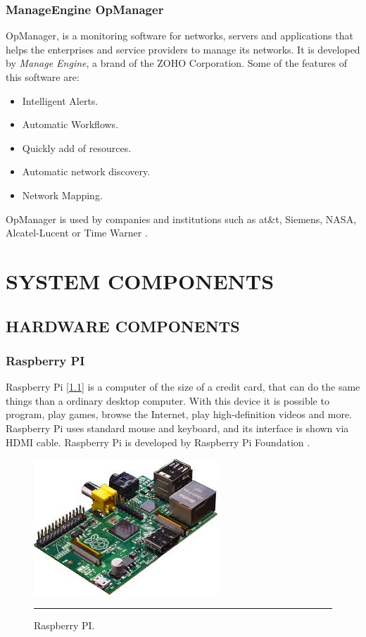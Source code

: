 \documentclass[12pt, a4paper,twoside]{tesi_upf}
\begin{document}
\subsection{ManageEngine OpManager}

OpManager, is a monitoring software for networks, servers and applications that helps the enterprises and service providers to manage its networks. It is developed by \textit{Manage Engine}, a brand of the ZOHO Corporation. Some of the features of this software are:
\begin{itemize}
\item Intelligent Alerts.
\item Automatic Workflows.
\item Quickly add of resources.
\item Automatic network discovery.
\item Network Mapping.
\end{itemize}

OpManager is used by companies and institutions such as at\&t, Siemens, NASA, Alcatel-Lucent or Time Warner \cite{opmanager}.


\chapter{SYSTEM COMPONENTS}
\label{Chapter3}

    \section{HARDWARE COMPONENTS}
        \subsection{Raspberry PI}
        Raspberry Pi [\ref{fig:raspberry}] is a computer of the size of a credit card, that can do the same things than a ordinary desktop computer. With this device it is possible to program, play games, browse the Internet, play high-definition videos and more. Raspberry Pi uses standard mouse and keyboard, and its interface is shown via HDMI cable. Raspberry Pi is developed by Raspberry Pi Foundation \cite{pi}.
        
        
        \begin{figure}[htbp]
          \centering
              \includegraphics[scale=0.8]{./figures/raspberrypi.png}
              \rule{32em}{0.7pt}
          \caption[Raspberry PI]{Raspberry PI.}
          \label{fig:raspberry}
        \end{figure}
        
\end{document}
